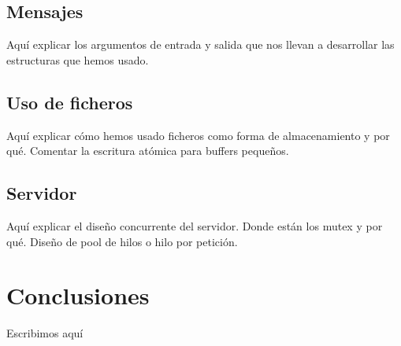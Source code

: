\documentclass[]{article}
\begin{document}
\subsection{Mensajes}
\label{subsec:mensajes}
Aquí explicar los argumentos de entrada y salida que nos llevan a desarrollar las estructuras que hemos usado.


\subsection{Uso de ficheros}
\label{subsec:uso_de_ficheros}
Aquí explicar cómo hemos usado ficheros como forma de almacenamiento y por qué. Comentar la escritura atómica para buffers pequeños. 


\subsection{Servidor}
\label{subsec:servidor}
Aquí explicar el diseño concurrente del servidor. Donde están los mutex y por qué. Diseño de pool de hilos o hilo por petición. 

\section{Conclusiones}
\label{sec:conclusiones}
Escribimos aquí
\end{document}
